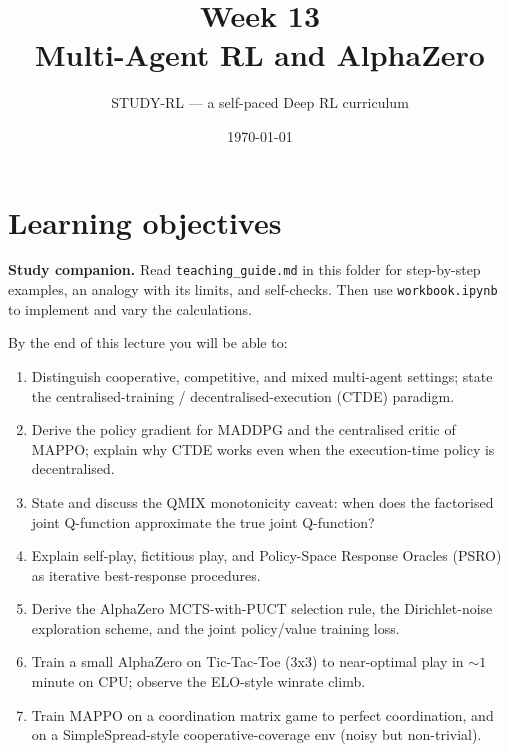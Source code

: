 \documentclass[11pt,oneside]{scrbook}
\title{{\color{rlblue}\textbf{Week 13} \\ \Huge Multi-Agent RL and AlphaZero}}
\author{STUDY-RL --- a self-paced Deep RL curriculum}
\date{\today}
\begin{document}
\maketitle
\tableofcontents
\newpage

\chapter*{Learning objectives}


\noindent\textbf{Study companion.} Read \texttt{teaching\_guide.md} in this
folder for step-by-step examples, an analogy with its limits, and self-checks.
Then use \texttt{workbook.ipynb} to implement and vary the calculations.
\par\medskip

\begin{keyidea}
By the end of this lecture you will be able to:
\begin{enumerate}\setlength\itemsep{2pt}
  \item Distinguish cooperative, competitive, and mixed multi-agent settings;
        state the centralised-training / decentralised-execution (CTDE)
        paradigm.
  \item Derive the policy gradient for MADDPG and the centralised critic of
        MAPPO; explain why CTDE works even when the execution-time policy is
        decentralised.
  \item State and discuss the QMIX monotonicity caveat: when does the
        factorised joint Q-function approximate the true joint Q-function?
  \item Explain self-play, fictitious play, and Policy-Space Response
        Oracles (PSRO) as iterative best-response procedures.
  \item Derive the AlphaZero MCTS-with-PUCT selection rule, the
        Dirichlet-noise exploration scheme, and the joint policy/value
        training loss.
  \item Train a small AlphaZero on Tic-Tac-Toe (3x3) to near-optimal play
        in $\sim 1$ minute on CPU; observe the ELO-style winrate climb.
  \item Train MAPPO on a coordination matrix game to perfect coordination,
        and on a SimpleSpread-style cooperative-coverage env (noisy but
        non-trivial).
\end{enumerate}
\end{keyidea}
\end{document}

